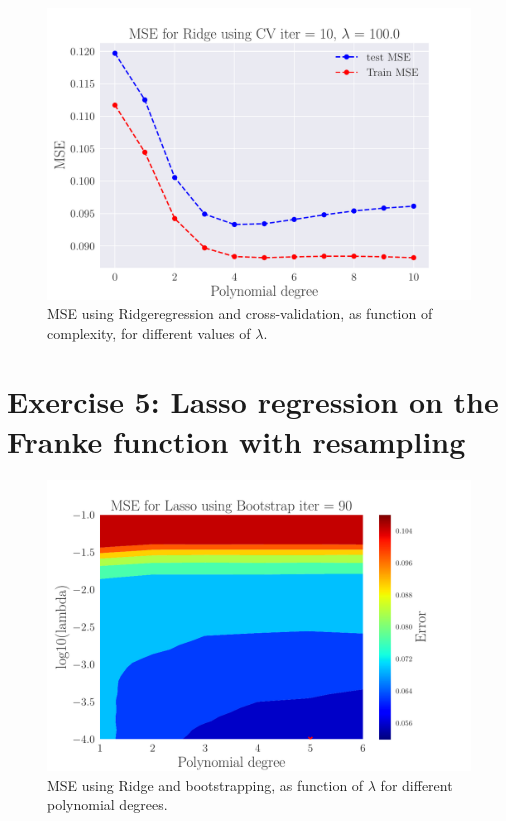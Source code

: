 \documentclass[reprint,english,notitlepage,aps,nobalancelastpage,nofootinbib]{revtex4-1}  %
\begin{document}
\begin{figure}[H]
	\endminipage\hfill
	\includegraphics[width=\linewidth]{MSE_Ridge_n30_eps02_pol10_CV_re10_lam_100_0.pdf}
	\endminipage
	\caption{MSE using Ridgeregression and cross-validation, as function of complexity, for different values of $\lambda$.} \label{fig:Ridge_CV_PM}
\end{figure}


\section*{Exercise 5: Lasso regression on the Franke function with resampling}

\begin{figure}[H]
\includegraphics[width=\linewidth]{Contour_PL_Lasso_Bootstrap90_n30_eps0.2_p1_6_lmbm1_m4.pdf}
\caption{MSE using Ridge and bootstrapping, as function of $\lambda$ for different polynomial degrees.}
\label{fig:Ridge_boot_BVT}
\end{figure}
\end{document}
